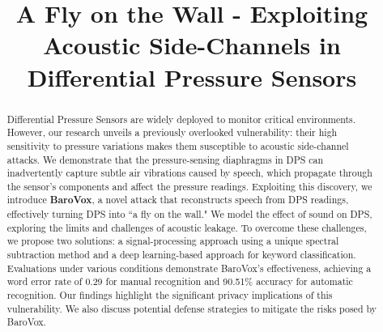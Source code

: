 \documentclass[conference,compsoc]{IEEEtran}
\begin{document}
\title{A Fly on the Wall - Exploiting Acoustic Side-Channels in Differential Pressure Sensors
}


\author{

}


\maketitle
\thispagestyle{plain}
\pagestyle{plain}
\begin{abstract}
Differential Pressure Sensors are widely deployed to monitor critical environments. However, our research unveils a previously overlooked vulnerability: their high sensitivity to pressure variations makes them susceptible to acoustic side-channel attacks. We demonstrate that the pressure-sensing diaphragms in DPS can inadvertently capture subtle air vibrations caused by speech, which propagate through the sensor's components and affect the pressure readings.
Exploiting this discovery, we introduce \textbf{BaroVox}, a novel attack that reconstructs speech from DPS readings, effectively turning DPS into ``a fly on the wall." We model the effect of sound on DPS, exploring the limits and challenges of acoustic leakage. To overcome these challenges, we propose two solutions: a signal-processing approach using a unique spectral subtraction method and a deep learning-based approach for keyword classification.
Evaluations under various conditions demonstrate BaroVox's effectiveness, achieving a word error rate of 0.29 for manual recognition and 90.51\% accuracy for automatic recognition. Our findings highlight the significant privacy implications of this vulnerability. 
We also discuss potential defense strategies to mitigate the risks posed by BaroVox.

\end{abstract}
\end{document}
